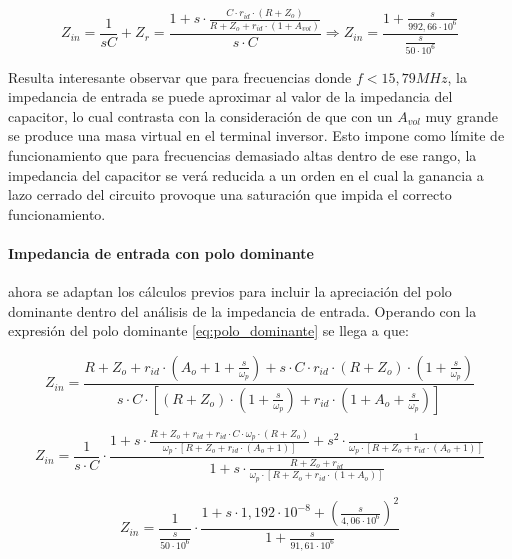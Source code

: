\begin{equation}
	Z_{in} = \frac{1}{sC} + Z_r
	= \frac{1 + s \cdot \frac{C \cdot r_{id} \cdot (R + Z_o)}{R + Z_o + r_{id} \cdot (1 + A_{vol})}}{s \cdot C}
	\Rightarrow
	Z_{in} = \frac{1 + \frac{s}{992,66 \cdot 10^{6}}}{\frac{s}{50 \cdot 10^{6}}}
\end{equation}

Resulta interesante observar que para frecuencias donde $f < 15,79 MHz$, la impedancia de entrada se puede aproximar al valor de la impedancia del capacitor, lo cual contrasta con la consideraci\'on de que con un $A_{vol}$ muy grande se produce una masa virtual en el terminal inversor. Esto impone como l\'imite de funcionamiento que para frecuencias demasiado altas dentro de ese rango, la impedancia del capacitor se ver\'a reducida a un orden en el cual la ganancia a lazo cerrado del circuito provoque una saturaci\'on que impida el correcto funcionamiento.

\paragraph*{Impedancia de entrada con polo dominante} ahora se adaptan los c\'alculos previos para incluir la apreciaci\'on del polo dominante dentro del an\'alisis de la impedancia de entrada. Operando con la expresi\'on del polo dominante \ref{eq:polo_dominante} se llega a que:

\begin{equation}
	Z_{in} = \frac{R + Z_o + r_{id} \cdot (A_o + 1 + \frac{s}{\omega_p}) + s \cdot C \cdot r_{id} \cdot (R + Z_o) \cdot (1 + \frac{s}{\omega_p})}{s \cdot C \cdot \left[ (R + Z_o) \cdot (1 + \frac{s}{\omega_p}) + r_{id} \cdot (1 + A_o + \frac{s}{\omega_p}) \right]}
\end{equation}

\begin{equation}
	Z_{in} = \frac{1}{s \cdot C} \cdot \frac{1 + s \cdot \frac{R + Z_o + r_{id} + r_{id} \cdot C \cdot \omega_p \cdot(R + Z_o)}{\omega_p \cdot \left[ R + Z_o + r_{id} \cdot (A_o + 1) \right]} + s^{2} \cdot \frac{1}{\omega_p \cdot \left[ R + Z_o + r_{id} \cdot (A_o + 1) \right]}}{1 + s \cdot \frac{R + Z_o + r_{id}}{\omega_p \cdot \left[ R + Z_o + r_{id} \cdot (1 + A_o)\right]}}
\end{equation}

\begin{equation}
	Z_{in} = \frac{1}{\frac{s}{50 \cdot 10^{6}}} \cdot
	\frac{1 + s \cdot 1,192 \cdot 10^{-8} + \left(\frac{s}{4,06 \cdot 10^{6}}\right)^{2}}{1 + \frac{s}{91,61 \cdot 10^{6}}}
\end{equation}

